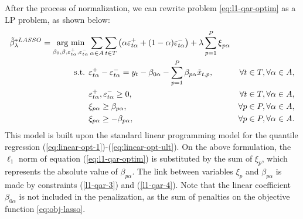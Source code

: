After the process of normalization, we can rewrite problem \ref{eq:l1-qar-optim} as a LP problem, as shown below:
\begin{eqnarray}
\tilde \beta_\lambda^{*LASSO} = \underset{\beta_{0},\beta,\varepsilon_{t \alpha}^{+},\varepsilon_{t \alpha}^{-}}{\text{arg min}} & \sum_{\alpha \in A} \sum_{t \in T}\left(\alpha\varepsilon_{t \alpha}^{+}+(1-\alpha)\varepsilon_{t \alpha}^{-}\right)+\lambda\sum_{p=1}^{P}\mbox{\ensuremath{\xi}}_{p \alpha} \label{eq:obj-lasso} \\
\mbox{s.t. } & \varepsilon_{t \alpha}^{+}-\varepsilon_{t \alpha}^{-}= y_{t}-\beta_{0 \alpha}-\sum_{p=1}^{P}\beta_{p \alpha}\tilde x_{t,p},&\forall t\in T, \forall \alpha \in A, \\
& \varepsilon_{t \alpha}^{+},\varepsilon_{t \alpha}^{-}\geq0,&\forall t \in T, \forall \alpha \in A,\\
& \xi_{p\alpha}\geq\beta_{p \alpha},&\forall p\in P, \forall \alpha \in A,  \label{l1-qar-3}
\\
& \xi_{p\alpha}\geq-\beta_{p \alpha},&\forall p\in P, \forall \alpha \in A.  \label{l1-qar-4}
\end{eqnarray}
This model is built upon the standard linear programming model for the quantile regression (\ref{eq:linear-opt-1})-(\ref{eq:linear-opt-ult}). 
On the above formulation, the $\ell_1$ norm of equation (\ref{eq:l1-qar-optim}) is substituted by the sum of $\xi_p$, which represents the absolute value of $\beta_{p\alpha}$. The link between variables $\xi_p$ and $\beta_{p\alpha}$ is made by constraints (\ref{l1-qar-3}) and (\ref{l1-qar-4}). Note that the linear coefficient $\beta_{0\alpha}$ is not included in the penalization, as the sum of penalties on the objective function \ref{eq:obj-lasso}.




